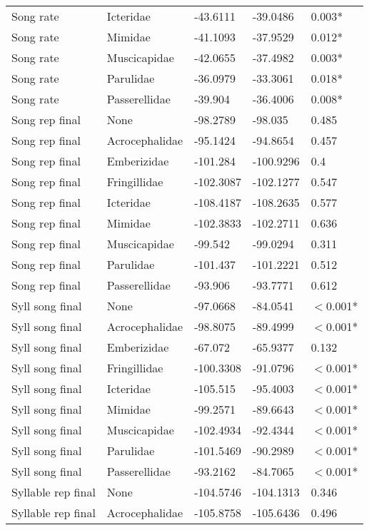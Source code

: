 \documentclass{article}\usepackage[]{graphicx}\usepackage[]{color}
\begin{document}
\begin{table}[ht]
\begin{tabular}{lllll}
  Song rate & Icteridae & -43.6111 & -39.0486 & 0.003* \\ 
  Song rate & Mimidae & -41.1093 & -37.9529 & 0.012* \\ 
  Song rate & Muscicapidae & -42.0655 & -37.4982 & 0.003* \\ 
  Song rate & Parulidae & -36.0979 & -33.3061 & 0.018* \\ 
  Song rate & Passerellidae & -39.904 & -36.4006 & 0.008* \\ 
  Song rep final & None & -98.2789 & -98.035 & 0.485 \\ 
  Song rep final & Acrocephalidae & -95.1424 & -94.8654 & 0.457 \\ 
  Song rep final & Emberizidae & -101.284 & -100.9296 & 0.4 \\ 
  Song rep final & Fringillidae & -102.3087 & -102.1277 & 0.547 \\ 
  Song rep final & Icteridae & -108.4187 & -108.2635 & 0.577 \\ 
  Song rep final & Mimidae & -102.3833 & -102.2711 & 0.636 \\ 
  Song rep final & Muscicapidae & -99.542 & -99.0294 & 0.311 \\ 
  Song rep final & Parulidae & -101.437 & -101.2221 & 0.512 \\ 
  Song rep final & Passerellidae & -93.906 & -93.7771 & 0.612 \\ 
  Syll song final & None & -97.0668 & -84.0541 & $<$0.001* \\ 
  Syll song final & Acrocephalidae & -98.8075 & -89.4999 & $<$0.001* \\ 
  Syll song final & Emberizidae & -67.072 & -65.9377 & 0.132 \\ 
  Syll song final & Fringillidae & -100.3308 & -91.0796 & $<$0.001* \\ 
  Syll song final & Icteridae & -105.515 & -95.4003 & $<$0.001* \\ 
  Syll song final & Mimidae & -99.2571 & -89.6643 & $<$0.001* \\ 
  Syll song final & Muscicapidae & -102.4934 & -92.4344 & $<$0.001* \\ 
  Syll song final & Parulidae & -101.5469 & -90.2989 & $<$0.001* \\ 
  Syll song final & Passerellidae & -93.2162 & -84.7065 & $<$0.001* \\ 
  Syllable rep final & None & -104.5746 & -104.1313 & 0.346 \\ 
  Syllable rep final & Acrocephalidae & -105.8758 & -105.6436 & 0.496 \\ 

\end{tabular}
\end{table}
\end{document}
